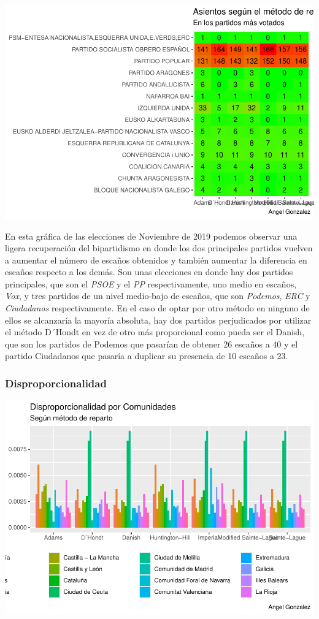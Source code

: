 \documentclass[12pt,a4paper,]{book}
\numberwithin{dummy}{section}
\theoremstyle{ocrenumbox}
\theoremstyle{blacknumex}
\theoremstyle{blacknumbox}
\theoremstyle{ocrenum}
\theoremstyle{ocrenum}
\begin{document}
\begin{center}\includegraphics[width=0.95\linewidth]{figurasR/unnamed-chunk-137-2} \end{center}

En esta gráfica de las elecciones de Noviembre de 2019 podemos observar
una ligera recuperación del bipartidismo en donde los dos principales
partidos vuelven a aumentar el número de escaños obtenidos y también
aumentar la diferencia en escaños respecto a los demás. Son unas
elecciones en donde hay dos partidos principales, que son el \emph{PSOE}
y el \emph{PP} respectivamente, uno medio en escaños, \emph{Vox}, y tres
partidos de un nivel medio-bajo de escaños, que son \emph{Podemos},
\emph{ERC} y \emph{Ciudadanos} respectivamente. En el caso de optar por
otro método en ninguno de ellos se alcanzaría la mayoría absoluta, hay
dos partidos perjudicados por utilizar el método D´Hondt en vez de otro
más proporcional como pueda ser el Danish, que son los partidos de
Podemos que pasarían de obtener 26 escaños a 40 y el partido Ciudadanos
que pasaría a duplicar su presencia de 10 escaños a 23.

\hypertarget{disproporcionalidad-13}{%
\subsubsection{Disproporcionalidad}\label{disproporcionalidad-13}}

\begin{center}\includegraphics[width=0.95\linewidth]{figurasR/unnamed-chunk-138-1} \end{center}
\end{document}
